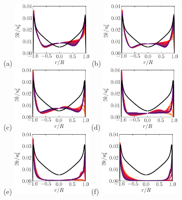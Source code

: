 \documentclass[lineno]{jfm}
\begin{document}
       \begin{figure}
       \centering
 	       (a) \includegraphics[width=4cm]{Figures/prof_tkeouter_rotz0_roty0.00390625.eps}
               (b) \includegraphics[width=4cm]{Figures/prof_tkeouter_rotz0_roty0.0078125.eps} \\
               (c) \includegraphics[width=4cm]{Figures/prof_tkeouter_rotz0_roty0.015625.eps}
               (d) \includegraphics[width=4cm]{Figures/prof_tkeouter_rotz0_roty0.03125.eps} \\
               (e) \includegraphics[width=4cm]{Figures/prof_tkeouter_rotz0_roty0.0625.eps}
               (f) \includegraphics[width=4cm]{Figures/prof_tkeouter_rotz0_roty0.125.eps} \\

\end{figure}
\end{document}
